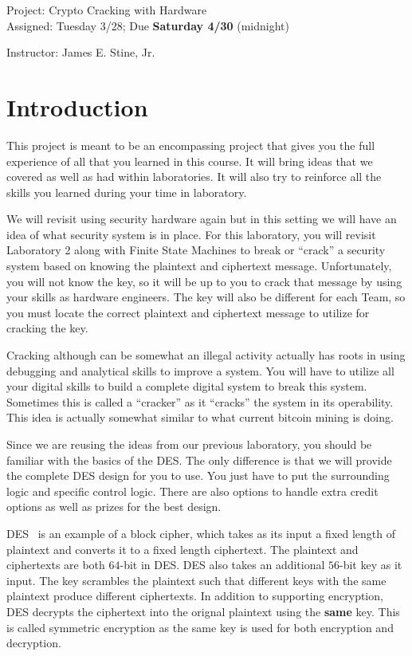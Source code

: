 \documentclass{article}
\newcommand{\myassignment}{Project: Crypto Cracking with Hardware}
\newcommand{\myduedate}{Assigned: Tuesday 3/28; Due \textbf{Saturday 4/30} (midnight)}
\newcommand{\myinstructor}{Instructor: James E. Stine, Jr.}
\begin{document}
\begin{center}
  {\huge \myassignment} \\
  {\large \myduedate} \\
  \begin{flushright}
  \myinstructor \\
  \end{flushright}
\end{center}

\section{Introduction}

This project is meant to be an encompassing project that gives you the
full experience of all that you learned in this course.  It will bring
ideas that we covered as well as had within laboratories.  It will
also try to reinforce all the skills you learned during your time in
laboratory.

We will revisit using security hardware again but in this setting we
will have an idea of what security system is in place.  For this
laboratory, you will revisit Laboratory 2 along with Finite State
Machines to break or ``crack'' a security system based on knowing the
plaintext and ciphertext message.  Unfortunately, you will not know
the key, so it will be up to you to crack that message by using your
skills as hardware engineers.  The key will also be different for each
Team, so you must locate the correct plaintext and ciphertext message
to utilize for cracking the key.

Cracking although can be somewhat an illegal activity actually has roots
in using debugging and analytical skills to improve a system.  You
will have to utilize all your digital skills to build a complete
digital system to break this system.  Sometimes this is called a
``cracker'' as it ``cracks'' the system in its operability.   This
idea is actually somewhat
similar to what current bitcoin mining is doing.

Since we are reusing the ideas from our previous laboratory, you
should be familiar with the basics of the DES.  The only difference is
that we will provide the complete DES design for you to use.  You just have
to put the surrounding logic and specific control logic.  There are
also options to handle extra credit options as well as prizes for the
best design.

DES~\cite{fips463} is an example of a block cipher, which takes as its input a fixed
length of plaintext and converts it to a fixed length ciphertext.
The plaintext and ciphertexts are both $64$-bit in DES.  DES also
takes an additional $56$-bit key as it input.  The key scrambles the
plaintext such that different keys with the same plaintext produce
different ciphertexts.  In addition to supporting encryption,
DES decrypts the ciphertext into the orignal plaintext using the \textbf{same}
key.  This is called symmetric encryption as the same key is used
for both encryption and decryption.
\end{document}
